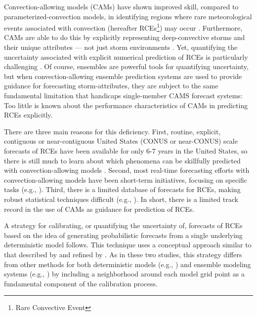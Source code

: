 Convection-allowing models (CAMs) have shown improved skill, compared to parameterized-convection models, in identifying regions where rare meteorological events associated with convection (hereafter RCEs\footnote{Rare Convective Event}) may occur \citep{Clark2010a}.
Furthermore, CAMs are able to do this by explicitly representing deep-convective storms and their unique attributes --- not just storm environments \citep{Kain2010}.
Yet, quantifying the uncertainty associated with explicit numerical prediction of RCEs is particularly challenging \citep{Sobash2011}.
Of course, ensembles are powerful tools for quantifying uncertainty, but when convection-allowing ensemble prediction systems are used to provide guidance for forecasting storm-attributes, they are subject to the same fundamental limitation that handicaps single-member CAMS forecast systems: Too little is known about the performance characteristics of CAMs in predicting RCEs explicitly.


There are three main reasons for this deficiency.
First, routine, explicit, contiguous  or near-contiguous United States (CONUS or near-CONUS) scale forecasts of RCEs have been available for only 6-7 years in the United States, so there is still much to learn about which phenomena can be skillfully predicted with convection-allowing models \citep{Kain2008, Kain2010}.
Second, most real-time forecasting efforts with convection-allowing models have been short-term initiatives, focusing on specific tasks (e.g., \citealp{Done2004, Weisman2008}).
Third, there is a limited database of forecasts for RCEs, making robust statistical techniques difficult (e.g., \citealp{Hamill2006}).
In short, there is a limited track record in the use of CAMs as guidance for prediction of RCEs.


A strategy for calibrating, or quantifying the uncertainty of, forecasts of RCEs based on the idea of generating probabilistic forecasts from a single underlying deterministic model follows.
This technique uses a conceptual approach similar to that described by \cite{Theis2005} and refined by \cite{Sobash2011}.
As in these two studies, this strategy differs from other methods for both deterministic models (e.g., \citealp{Glahn1972}) and ensemble modeling systems (e.g., \citealp{Hamill1998, Raftery2005, Clark2009, Glahn2009}) by including a neighborhood around each model grid point as a fundamental component of the calibration process.


